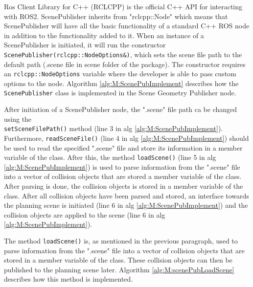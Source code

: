 Ros Client Library for C++ (RCLCPP) is the official C++ API for interacting with ROS2. ScenePublisher inherits from "rclcpp::Node" which means that ScenePublisher will have all the basic functionality of a standard C++ ROS node in addition to the functionality added to it. When an instance of a ScenePublisher is initiated, it will run the constructor \\\lstinline{ScenePublisher(rclcpp::NodeOptions&)}, which sets the scene file path to the default path (.scene file in scene folder of the package). The constructor requires an \lstinline{rclcpp::NodeOptions} variable where the developer is able to pass custom options to the node. Algorithm \ref{alg:M:ScenePubImplement} describes how the \lstinline{ScenePublisher} class is implemented in the Scene Geometry Publisher node.



After initiation of a ScenePublisher node, the ".scene" file path ca be changed using the \\\lstinline{setSceneFilePath()} method (line 3 in alg \ref{alg:M:ScenePubImplement}). Furthermore, \lstinline{readSceneFile()} (line 4 in alg \ref{alg:M:ScenePubImplement}) should be used to read the specified ".scene" file and store its information in a member variable of the class. After this, the method \lstinline{loadScene()} (line 5 in alg \ref{alg:M:ScenePubImplement}) is used to parse information from the ".scene" file into a vector of collision objects that are stored a member variable of the class. After parsing is done, the collision objects is stored in a member variable of the class. After all collision objects have been parsed and stored, an interface towards the planning scene is initiated (line 6 in alg \ref{alg:M:ScenePubImplement}) and the collision objects are applied to the scene (line 6 in alg \ref{alg:M:ScenePubImplement}).

The method \lstinline{loadScene()} is, as mentioned in the previous paragraph, used to parse information from the ".scene" file into a vector of collision objects that are stored in a member variable of the class. These collision objects can then be published to the planning scene later. Algorithm \ref{alg:M:scenePubLoadScene} describes how this method is implemented.



